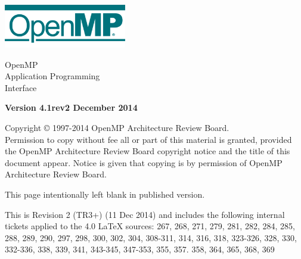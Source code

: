 
  \begin{titlepage}
    \begin{flushleft}
     \hspace{-6em} \includegraphics[width=0.4\textwidth]{openmp-logo.png}
    \end{flushleft}

    \begin{adjustwidth}{-0.75in}{0in}
    \begin{center}
      \Huge
      \textsf{OpenMP\\Application Programming\\Interface}

      \vspace{0.5in}\textsf{    }\vspace{-0.7in}
      \normalsize

      \vspace{1.0in}

      \textbf{Version 4.1rev2 December 2014}
    \end{center}
    \end{adjustwidth}

    \vspace{3.0in}

\begin{adjustwidth}{0pt}{1em}\setlength{\parskip}{0.25\baselineskip}%
Copyright © 1997-2014 OpenMP Architecture Review Board.\\
Permission to copy without fee all or part of this material is granted,
provided the OpenMP Architecture Review Board copyright notice and
the title of this document appear. Notice is given that copying is by
permission of OpenMP Architecture Review Board.\end{adjustwidth}

  \end{titlepage}


\clearpage
\thispagestyle{empty}
\phantom{a}
This page intentionally left blank in published version.

This is Revision 2 (TR3+) (11 Dec 2014) and includes the following internal tickets applied to the 4.0 LaTeX sources:
267, 268, 271, 279, 281, 282, 284, 285, 288, 289, 290, 297, 298, 300, 302, 304, 308-311, 314, 316, 318, 323-326, 328, 330, 332-336, 338, 339, 341, 343-345, 347-353, 355, 357. 358, 364, 365, 368, 369 


\vfill

